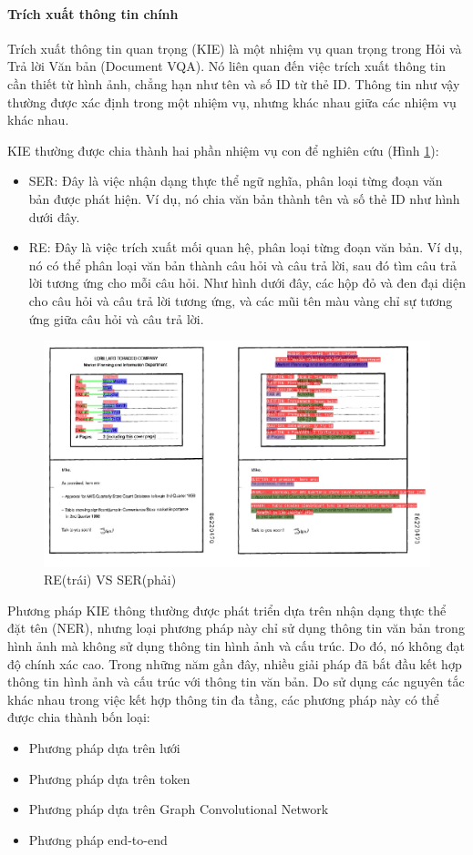 \paragraph{Trích xuất thông tin chính}
Trích xuất thông tin quan trọng (KIE) là một nhiệm vụ quan trọng trong Hỏi và Trả lời Văn bản (Document VQA). Nó liên quan đến việc trích xuất thông tin cần thiết từ hình ảnh, chẳng hạn như tên và số ID từ thẻ ID. Thông tin như vậy thường được xác định trong một nhiệm vụ, nhưng khác nhau giữa các nhiệm vụ khác nhau.

KIE thường được chia thành hai phần nhiệm vụ con để nghiên cứu (Hình \ref{fig8:ser-re}):
\begin{itemize}
    \item SER: Đây là việc nhận dạng thực thể ngữ nghĩa, phân loại từng đoạn văn bản được phát hiện. Ví dụ, nó chia văn bản thành tên và số thẻ ID như hình dưới đây.
    \item RE: Đây là việc trích xuất mối quan hệ, phân loại từng đoạn văn bản. Ví dụ, nó có thể phân loại văn bản thành câu hỏi và câu trả lời, sau đó tìm câu trả lời tương ứng cho mỗi câu hỏi. Như hình dưới đây, các hộp đỏ và đen đại diện cho câu hỏi và câu trả lời tương ứng, và các mũi tên màu vàng chỉ sự tương ứng giữa câu hỏi và câu trả lời.
\end{itemize}

\begin{figure}[h]
    \includegraphics[scale=0.6]{images/re-vs-ser.png}
    \centering
    \caption{RE(trái) VS SER(phải)}
    \label{fig8:ser-re}
\end{figure}

Phương pháp KIE thông thường được phát triển dựa trên nhận dạng thực thể đặt tên (NER), nhưng loại phương pháp này chỉ sử dụng thông tin văn bản trong hình ảnh mà không sử dụng thông tin hình ảnh và cấu trúc. Do đó, nó không đạt độ chính xác cao. Trong những năm gần đây, nhiều giải pháp đã bắt đầu kết hợp thông tin hình ảnh và cấu trúc với thông tin văn bản. Do sử dụng các nguyên tắc khác nhau trong việc kết hợp thông tin đa tầng, các phương pháp này có thể được chia thành bốn loại:
\begin{itemize}
    \item Phương pháp dựa trên lưới
    \item Phương pháp dựa trên token
    \item Phương pháp dựa trên Graph Convolutional Network
    \item Phương pháp end-to-end
\end{itemize}